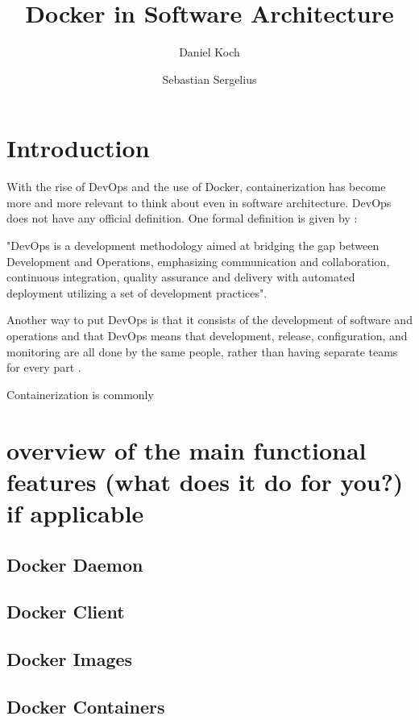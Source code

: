 \documentclass[fleqn,12pt]{olplainarticle}
\title{Docker in Software Architecture}
\author[1]{Daniel Koch}
\author[2]{Sebastian Sergelius}
\affil[1]{daniel.koch@helsinki.fi}
\affil[2]{github.com/sebazai}
\begin{document}
\flushbottom
\maketitle
\thispagestyle{empty}

\section*{Introduction}

With the rise of DevOps and the use of Docker, containerization has become more and more relevant to think about even
in software architecture. DevOps does not have any official definition.
One formal definition is given by \cite{Jabbari_devops}: 
\begin{displayquote}
"DevOps is a development methodology aimed at bridging the gap between Development and Operations, emphasizing communication and collaboration, continuous integration, quality assurance and delivery with automated deployment utilizing a set of development practices".
\end{displayquote}
Another way to put DevOps is that it consists of the development of software and operations and that DevOps means that development, release, configuration, and monitoring are all done by the same people, rather than having separate teams for every part \citep{hy:DevOps_with_Docker}.

Containerization is commonly


\section*{overview of the main functional features (what does it do for you?) if applicable}

\subsection*{Docker Daemon}

\subsection*{Docker Client}

\subsection*{Docker Images}

\subsection*{Docker Containers}
\end{document}
